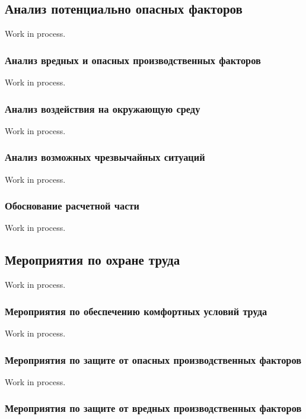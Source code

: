 \subsection{Анализ потенциально опасных факторов}

Work in process.

\subsubsection{Анализ вредных и опасных производственных факторов}

Work in process.

\subsubsection{Анализ воздействия на окружающую среду}

Work in process.

\subsubsection{Анализ возможных чрезвычайных ситуаций}

Work in process.

\subsubsection{Обоснование расчетной части}

Work in process.

\subsection{Мероприятия по охране труда}

Work in process.

\subsubsection{Мероприятия по обеспечению комфортных условий труда}

Work in process.

\subsubsection{Мероприятия по защите от опасных производственных факторов}

Work in process.

\subsubsection{Мероприятия по защите от вредных производственных факторов}

